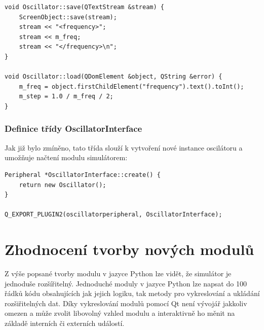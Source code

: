 \begin{lstlisting}
void Oscillator::save(QTextStream &stream) {
	ScreenObject::save(stream);
	stream << "<frequency>";
	stream << m_freq;
	stream << "</frequency>\n";
}

void Oscillator::load(QDomElement &object, QString &error) {
	m_freq = object.firstChildElement("frequency").text().toInt();
	m_step = 1.0 / m_freq / 2;
}
\end{lstlisting}

\subsubsection{Definice třídy OscillatorInterface}

Jak již bylo zmíněno, tato třída slouží k vytvoření nové instance oscilátoru a umožňuje načtení modulu simulátorem:

\begin{lstlisting}
Peripheral *OscillatorInterface::create() {
	return new Oscillator();
}

Q_EXPORT_PLUGIN2(oscillatorperipheral, OscillatorInterface);
\end{lstlisting}

\section{Zhodnocení tvorby nových modulů}
Z výše popsané tvorby modulu v jazyce Python lze vidět, že simulátor je jednoduše rozšířitelný. Jednoduché moduly v jazyce Python lze napsat do 100 řádků kódu obsahujících jak jejich logiku, tak metody pro vykreslování a ukládání rozšiřitelných dat. Díky vykreslování modulů pomocí Qt není vývojář jakkoliv omezen a může zvolit libovolný vzhled modulu a interaktivně ho měnit na základě interních či externích událostí.

